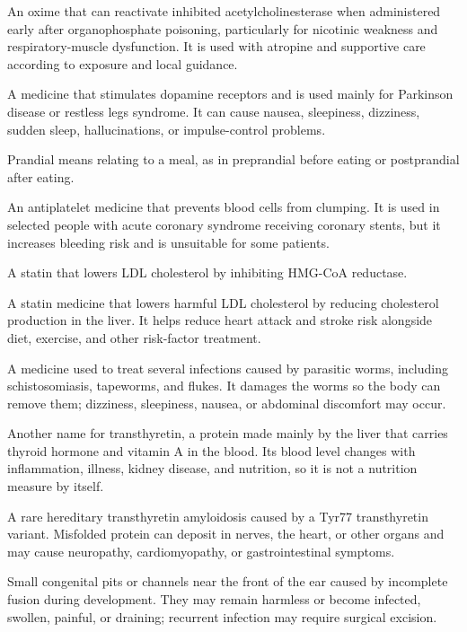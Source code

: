  An oxime that can reactivate inhibited acetylcholinesterase when administered early
after organophosphate poisoning, particularly for nicotinic weakness and
respiratory-muscle dysfunction. It is used with atropine and supportive care according
to exposure and local guidance.

 A medicine that stimulates dopamine receptors and is used mainly for Parkinson disease or restless legs syndrome. It can cause nausea, sleepiness, dizziness, sudden sleep, hallucinations, or impulse-control problems.

 Prandial means relating to a meal, as in preprandial before eating or postprandial after eating.

 An antiplatelet medicine that prevents blood cells from clumping. It is used in selected people with acute coronary syndrome receiving coronary stents, but it increases bleeding risk and is unsuitable for some patients.

 A statin that lowers LDL cholesterol by inhibiting HMG-CoA reductase.

 A statin medicine that lowers harmful LDL cholesterol by reducing cholesterol production in the liver. It helps reduce heart attack and stroke risk alongside diet, exercise, and other risk-factor treatment.

 A medicine used to treat several infections caused by parasitic worms, including schistosomiasis, tapeworms, and flukes. It damages the worms so the body can remove them; dizziness, sleepiness, nausea, or abdominal discomfort may occur.

 Another name for transthyretin, a protein made mainly by the liver that carries thyroid hormone and vitamin A in the blood. Its blood level changes with inflammation, illness, kidney disease, and nutrition, so it is not a nutrition measure by itself.

 A rare hereditary transthyretin amyloidosis caused by a Tyr77 transthyretin variant. Misfolded protein can deposit in nerves, the heart, or other organs and may cause neuropathy, cardiomyopathy, or gastrointestinal symptoms.

 Small congenital pits or channels near the front of the ear caused by incomplete fusion during development. They may remain harmless or become infected, swollen, painful, or draining; recurrent infection may require surgical excision.

